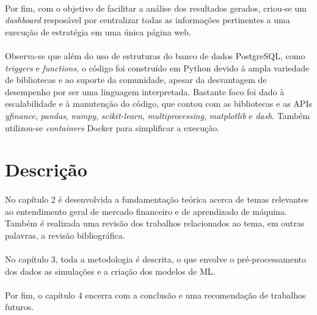\paragraph{} Por fim, com o objetivo de facilitar a análise dos resultados gerados, criou-se um \textit{dashboard} resposável por centralizar todas as informações pertinentes a uma execução de estratégia em uma única página web.

\paragraph{} Observa-se que além do uso de estruturas do banco de dados PostgreSQL, como \textit{triggers} e \textit{functions}, o código foi construído em Python devido à ampla variedade de bibliotecas e ao suporte da comunidade, apesar da desvantagem de desempenho por ser uma linguagem interpretada. Bastante foco foi dado à escalabilidade e à manutenção do código, que contou com as bibliotecas e as APIs \textit{yfinance}, \textit{pandas}, \textit{numpy}, \textit{scikit-learn}, \textit{multiprocessing}, \textit{matplotlib} e \textit{dash}. Também utilizou-se \textit{containers} Docker para simplificar a execução.



\section{Descrição}

\paragraph{} No capítulo 2 é desenvolvida a fundamentação teórica acerca de temas relevantes ao entendimento geral de mercado financeiro e de aprendizado de máquina. Também é realizada uma revisão dos trabalhos relacionados ao tema, em outras palavras, a revisão bibliográfica.

\paragraph{} No capítulo 3, toda a metodologia é descrita, o que envolve o pré-processamento dos dados as simulações e a criação dos modelos de ML.

\paragraph{} Por fim, o capítulo 4 encerra com a conclusão e uma recomendação de trabalhos futuros.